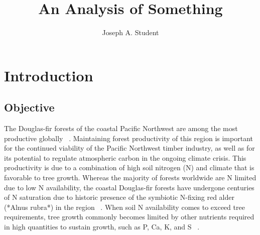 \documentclass[double,12pt]{beavtex}
\title{An Analysis of Something}
\author{Joseph A. Student}
\begin{document}
\maketitle
\mainmatter


\chapter{Introduction}

\section{Objective}


The Douglas-fir forests of the coastal Pacific Northwest are among the most productive globally ~\citep{mcardleYieldDouglasFir1930,waringEvergreenConiferousForests1979,HermanLavender1999}. Maintaining forest productivity of this region is important for the continued viability of the Pacific Northwest timber industry, as well as for its potential to regulate atmospheric carbon in the ongoing climate crisis. This productivity is due to a combination of high soil nitrogen (N) and climate that is favorable to tree growth. Whereas the majority of forests worldwide are N limited due to low N availability, the coastal Douglas-fir forests  have undergone centuries of N saturation due to historic presence of the symbiotic N-fixing red alder (*Alnus rubra*) in the region ~\citep{binkley1983}. When soil N availability comes to exceed tree requirements, tree growth commonly becomes limited by other nutrients required in high quantities to sustain growth, such as P, Ca, K, and S ~\citep{mainwaringThreeyearGrowthResponse2014, perakisForestCalciumDepletion2013, turnerUseFoliageSulphate1977, radwanNutritionDouglasfir}. 
\end{document}
